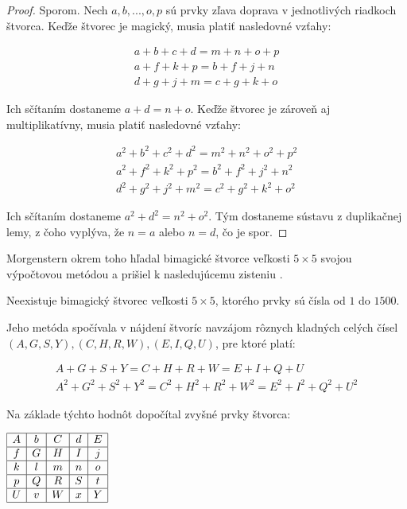 \begin{proof} Sporom. Nech $a, b, ... , o, p$ sú prvky zľava doprava v jednotlivých riadkoch štvorca. Keďže štvorec je magický, musia platiť nasledovné vzťahy:

\begin{gather}
a + b + c + d = m + n + o + p \\
a + f + k + p = b + f + j + n \\
d + g + j + m = c + g + k + o
\end{gather}

Ich sčítaním dostaneme $a + d = n + o$. Keďže štvorec je zároveň aj multiplikatívny, musia platiť nasledovné vzťahy:

\begin{gather}
a^2 + b^2 + c^2 + d^2 = m^2 + n^2 + o^2 + p^2 \\
a^2 + f^2 + k^2 + p^2 = b^2 + f^2 + j^2 + n^2 \\
d^2 + g^2 + j^2 + m^2 = c^2 + g^2 + k^2 + o^2
\end{gather}

Ich sčítaním dostaneme $a^2 + d^2 = n^2 + o^2$. Tým dostaneme sústavu z duplikačnej lemy, z čoho vyplýva, že $n = a$ alebo $n = d$, čo je spor.
\end{proof} 

Morgenstern okrem toho hľadal bimagické štvorce veľkosti $5 \times 5$ svojou výpočtovou metódou a prišiel k nasledujúcemu zisteniu \cite{multimagie}.

\begin{theorem} Neexistuje bimagický štvorec veľkosti $5 \times 5$, ktorého prvky sú čísla od $1$ do $1500$.
\end{theorem}

Jeho metóda spočívala v nájdení štvoríc navzájom rôznych kladných celých čísel $(A,G,S,Y), (C,H,R,W), (E,I,Q,U)$, pre ktoré platí:

\begin{gather}
A+G+S+Y = C+H+R+W = E+I+Q+U \\
A^2+G^2+S^2+Y^2 = C^2+H^2+R^2+W^2 = E^2+I^2+Q^2+U^2
\end{gather}

Na základe týchto hodnôt dopočítal zvyšné prvky štvorca:

\begin{center}
$\begin{array}{ |c|c|c|c|c| }
\hline
A & b & C & d & E \\ 
\hline
f & G & H & I & j  \\ 
\hline
k & l & m & n & o \\ 
\hline
p & Q & R & S & t \\ 
\hline
U & v & W & x & Y \\
\hline
\end{array}$
\end{center}

